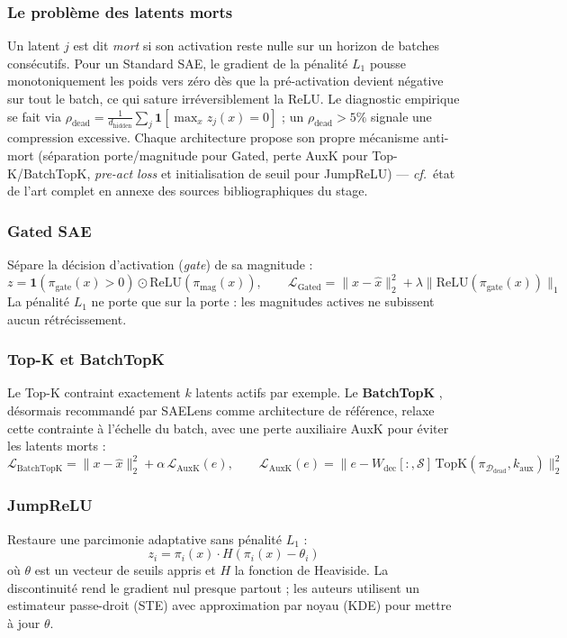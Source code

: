 \documentclass[11pt]{article}
\newcommand{\ind}{\mathbf{1}}
\begin{document}
\subsubsection{Le problème des latents morts}

Un latent $j$ est dit \emph{mort} si son activation reste nulle sur un
horizon de batches consécutifs. Pour un Standard SAE, le gradient de la
pénalité $L_1$ pousse monotoniquement les poids vers zéro dès que la
pré-activation devient négative sur tout le batch, ce qui sature
irréversiblement la ReLU. Le diagnostic empirique se fait via
$\rho_\text{dead} = \frac{1}{d_\text{hidden}} \sum_j \ind[\max_x z_j(x) = 0]$ ;
un $\rho_\text{dead} > 5\%$ signale une compression excessive. Chaque
architecture propose son propre mécanisme anti-mort (séparation porte/magnitude
pour Gated, perte AuxK pour Top-K/BatchTopK, \emph{pre-act loss} et
initialisation de seuil pour JumpReLU) --- \emph{cf.}~état de l'art complet en
annexe des sources bibliographiques du stage.

\subsubsection{Gated SAE}
Sépare la décision d'activation (\emph{gate}) de sa magnitude
\cite{rajamanoharan2024gated} :
\[
  z = \ind(\pi_\text{gate}(x) > 0) \odot \text{ReLU}(\pi_\text{mag}(x)), \qquad
  \mathcal{L}_\text{Gated} = \|x - \hat{x}\|_2^2 + \lambda \|\text{ReLU}(\pi_\text{gate}(x))\|_1
\]
La pénalité $L_1$ ne porte que sur la porte : les magnitudes actives ne
subissent aucun rétrécissement.

\subsubsection{Top-K et BatchTopK}
Le Top-K contraint exactement $k$ latents actifs par exemple. Le
\textbf{BatchTopK} \cite{gao2024topk, bussmann2025batchtopk}, désormais
recommandé par SAELens comme architecture de référence, relaxe cette
contrainte à l'échelle du batch, avec une perte auxiliaire AuxK pour éviter
les latents morts :
\[
  \mathcal{L}_\text{BatchTopK} = \|x - \hat{x}\|_2^2 + \alpha\,\mathcal{L}_\text{AuxK}(e), \qquad
  \mathcal{L}_\text{AuxK}(e) = \bigl\|e - W_\text{dec}[:,\mathcal{S}]\,\text{TopK}(\pi_{\mathcal{D}_\text{dead}}, k_\text{aux})\bigr\|_2^2
\]

\subsubsection{JumpReLU}
Restaure une parcimonie adaptative sans pénalité $L_1$
\cite{rajamanoharan2024jumprelu} :
\[
  z_i = \pi_i(x) \cdot H(\pi_i(x) - \theta_i)
\]
où $\theta$ est un vecteur de seuils appris et $H$ la fonction de Heaviside.
La discontinuité rend le gradient nul presque partout ; les auteurs
utilisent un estimateur passe-droit (STE) avec approximation par noyau (KDE)
pour mettre à jour $\theta$.
\end{document}
